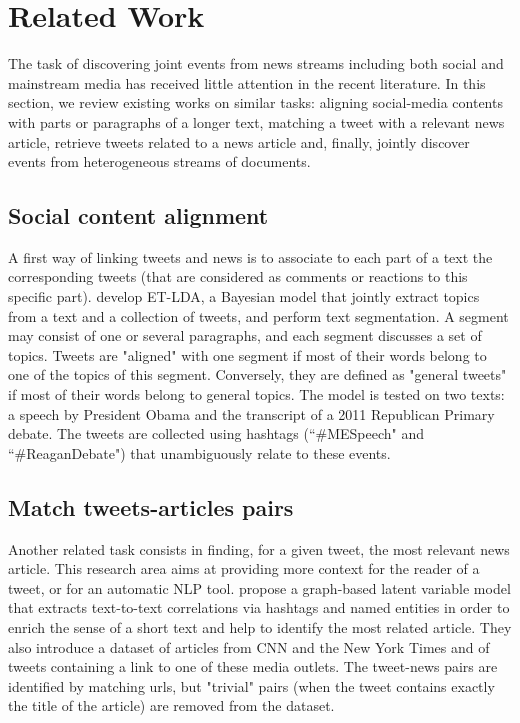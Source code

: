\section{Related Work}

The task of discovering joint events from news streams including both social and mainstream media has received little attention in the recent literature. In this section, we review existing works on similar tasks: aligning social-media contents with parts or paragraphs of a longer text, matching a tweet with a relevant news article, retrieve tweets related to a news article and, finally, jointly discover events from heterogeneous streams of documents.

\subsection{Social content alignment}
\label{Social content alignment}
A first way of linking tweets and news is to associate to each part of a text the corresponding tweets (that are considered as comments or reactions to this specific part). \cite{hu_et-lda:_2012} develop ET-LDA, a Bayesian model that jointly extract topics from a text and a collection of tweets, and perform text segmentation. A segment may consist of one or several paragraphs, and each segment discusses a set of topics. Tweets are "aligned" with one segment if most of their words belong to one of the topics of this segment. Conversely, they are defined as "general tweets" if most of their words belong to general topics. The model is tested on two texts: a speech by President Obama and the transcript of a 2011 Republican Primary debate. The tweets are collected using hashtags (``\#MESpeech" and ``\#ReaganDebate") that unambiguously relate to these events. 

\subsection{Match tweets-articles pairs}
\label{Match tweets-articles pairs}
Another related task consists in finding, for a given tweet, the most relevant news article. This research area aims at providing more context for the reader of a tweet, or for an automatic NLP tool. \cite{guo_linking_2013} propose a graph-based latent variable model that extracts text-to-text correlations via hashtags and named entities in order to enrich the sense of a short text and help to identify the most related article. They also introduce a dataset of articles from CNN and the New York Times and of tweets containing a link to one of these media outlets. The tweet-news pairs are identified by matching urls, but "trivial" pairs (when the tweet contains exactly the title of the article) are removed from the dataset.

